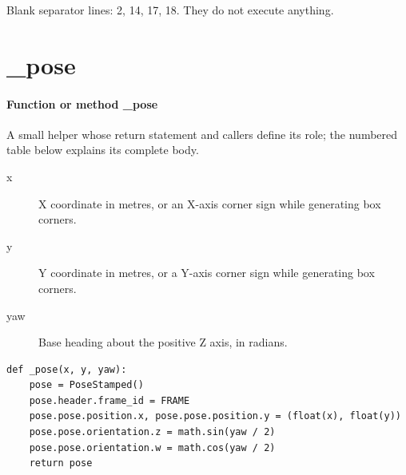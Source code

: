\documentclass[11pt,a4paper]{book}
\begin{document}
Blank separator lines: 2, 14, 17, 18. They do not execute anything.

\section{\_pose}

\paragraph{Function or method \_pose}
A small helper whose return statement and callers define its role; the numbered table below explains its complete body.

\begin{description}
\item[x] X coordinate in metres, or an X-axis corner sign while generating box corners.
\item[y] Y coordinate in metres, or a Y-axis corner sign while generating box corners.
\item[yaw] Base heading about the positive Z axis, in radians.
\end{description}

\begin{lstlisting}[firstnumber=19]
def _pose(x, y, yaw):
    pose = PoseStamped()
    pose.header.frame_id = FRAME
    pose.pose.position.x, pose.pose.position.y = (float(x), float(y))
    pose.pose.orientation.z = math.sin(yaw / 2)
    pose.pose.orientation.w = math.cos(yaw / 2)
    return pose


\end{lstlisting}
\end{document}
